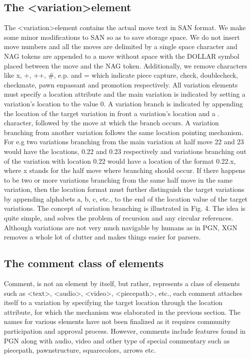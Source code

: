 \documentclass[conference]{IEEEtran}
\begin{document}
\subsection{The \textless variation\textgreater  element}
The \textless variation\textgreater  element contains the actual move text in SAN format. We make some minor modifications to SAN so as to save storage space. We do not insert move numbers and all the moves are delimited by a single space character and NAG tokens are appended to a move without space with the DOLLAR symbol placed between the move and the NAG token. Additionally, we remove characters like x, +, ++, \#, e.p. and = which indicate piece capture, check, double\textendash check, checkmate, pawn en\textendash passant and promotion respectively. All variation elements must specify a location attribute and the main variation is indicated by setting a variation's location to the value 0. A variation branch is indicated by appending the location of the target variation in front a variation's location and a . character, followed by the move at which the branch occurs. A variation branching from another variation follows the same location pointing mechanism. For e.g two variations branching from the main variation at half move 22 and 23 would have the locations, 0.22 and 0.23 respectively and variations branching out of the variation with location 0.22 would have a location of the format 0.22.x, where x stands for the half move where branching should occur. If there happens to be two or more variations branching from the same half move in the same variation, then the location format must further distinguish the target variations by appending alphabets a, b, c, etc., to the end of the location value of the target variations. The concept of variation branching is illustrated in Fig. 4. The idea is quite simple, and solves the problem of recursion and any circular references. Although variations are not very much navigable by humans as in PGN, XGN removes a whole lot of clutter and makes things easier for parsers.


\subsection{The comment class of elements}
Comment, is not an element by itself, but rather, represents a class of elements such as \textless text\textgreater , \textless audio\textgreater , \textless video\textgreater , \textless piecepath\textgreater , etc., each comment attaches itself to a variation by specifying the target location through the location attribute, for which the mechanism was elaborated in the previous section. The names for various elements have not been finalized as it requires community participation and approval process. However, comments include features found in PGN along with audio, video and other type of special commentary such as piece\textendash path, pawn\textendash structure, square\textendash colors, arrows etc.
\end{document}
